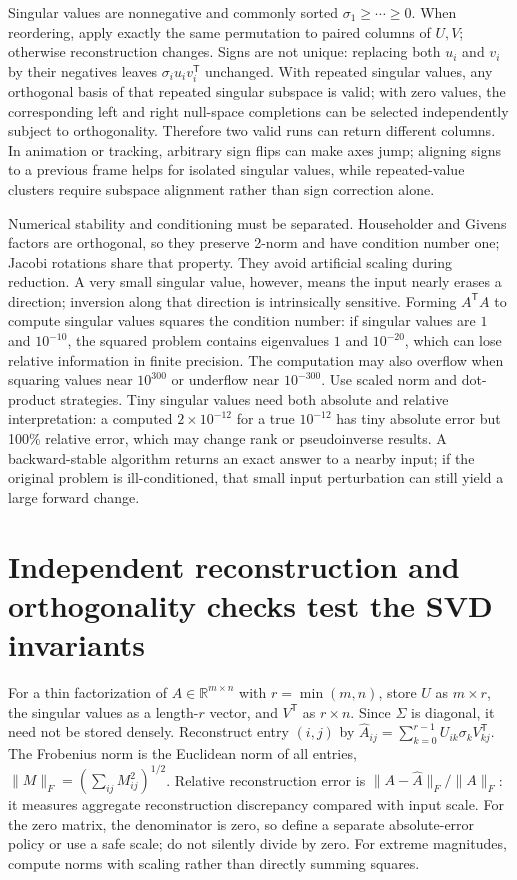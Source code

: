 Singular values are nonnegative and commonly sorted \(\sigma_1\ge\cdots\ge0\). When reordering, apply exactly the same permutation to paired columns of \(U,V\); otherwise reconstruction changes. Signs are not unique: replacing both \(u_i\) and \(v_i\) by their negatives leaves \(\sigma_i u_iv_i^\mathsf T\) unchanged. With repeated singular values, any orthogonal basis of that repeated singular subspace is valid; with zero values, the corresponding left and right null-space completions can be selected independently subject to orthogonality. Therefore two valid runs can return different columns. In animation or tracking, arbitrary sign flips can make axes jump; aligning signs to a previous frame helps for isolated singular values, while repeated-value clusters require subspace alignment rather than sign correction alone.

Numerical stability and conditioning must be separated. Householder and Givens factors are orthogonal, so they preserve 2-norm and have condition number one; Jacobi rotations share that property. They avoid artificial scaling during reduction. A very small singular value, however, means the input nearly erases a direction; inversion along that direction is intrinsically sensitive. Forming \(A^\mathsf TA\) to compute singular values squares the condition number: if singular values are \(1\) and \(10^{-10}\), the squared problem contains eigenvalues \(1\) and \(10^{-20}\), which can lose relative information in finite precision. The computation may also overflow when squaring values near \(10^{300}\) or underflow near \(10^{-300}\). Use scaled norm and dot-product strategies. Tiny singular values need both absolute and relative interpretation: a computed \(2\times10^{-12}\) for a true \(10^{-12}\) has tiny absolute error but 100\% relative error, which may change rank or pseudoinverse results. A backward-stable algorithm returns an exact answer to a nearby input; if the original problem is ill-conditioned, that small input perturbation can still yield a large forward change.

\section{Independent reconstruction and orthogonality checks test the SVD invariants}\label{02-foundations-ii-ch038-independent-reconstruction-and-orthogonality-checks-test-the-svd-invariants}

For a thin factorization of \(A\in\mathbb R^{m\times n}\) with \(r=\min(m,n)\), store \(U\) as \(m\times r\), the singular values as a length-\(r\) vector, and \(V^\mathsf T\) as \(r\times n\). Since \(\Sigma\) is diagonal, it need not be stored densely. Reconstruct entry \((i,j)\) by \(\hat A_{ij}=\sum_{k=0}^{r-1}U_{ik}\sigma_kV^\mathsf T_{kj}\). The Frobenius norm is the Euclidean norm of all entries, \(\|M\|_F=(\sum_{ij}M_{ij}^2)^{1/2}\). Relative reconstruction error is \(\|A-\hat A\|_F/\|A\|_F\): it measures aggregate reconstruction discrepancy compared with input scale. For the zero matrix, the denominator is zero, so define a separate absolute-error policy or use a safe scale; do not silently divide by zero. For extreme magnitudes, compute norms with scaling rather than directly summing squares.

